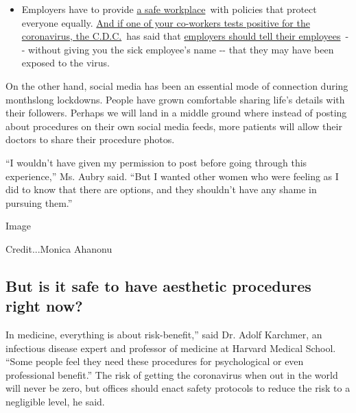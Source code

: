 \begin{itemize}
  \begin{itemize}
  \tightlist
  \item
    Employers have to provide
    \href{https://www.osha.gov/SLTC/covid-19/standards.html}{a safe
    workplace}~with policies that protect everyone equally.
    \href{https://www.nytimes3xbfgragh.onion/article/coronavirus-money-unemployment.html?action=click\&pgtype=Article\&state=default\&region=MAIN_CONTENT_3\&context=storylines_faq}{And
    if one of your co-workers tests positive for the coronavirus, the
    C.D.C.}~has said that
    \href{https://www.cdc.gov/coronavirus/2019-ncov/community/guidance-business-response.html}{employers
    should tell their employees}~-\/- without giving you the sick
    employee's name -\/- that they may have been exposed to the virus.
  \end{itemize}
\end{itemize}

On the other hand, social media has been an essential mode of connection
during monthslong lockdowns. People have grown comfortable sharing
life's details with their followers. Perhaps we will land in a middle
ground where instead of posting about procedures on their own social
media feeds, more patients will allow their doctors to share their
procedure photos.

``I wouldn't have given my permission to post before going through this
experience,'' Ms. Aubry said. ``But I wanted other women who were
feeling as I did to know that there are options, and they shouldn't have
any shame in pursuing them.''

Image

Credit...Monica Ahanonu

\hypertarget{but-is-it-safe-to-have-aesthetic-procedures-right-now}{%
\subsection{But is it safe to have aesthetic procedures right
now?}\label{but-is-it-safe-to-have-aesthetic-procedures-right-now}}

In medicine, everything is about risk-benefit,'' said Dr. Adolf
Karchmer, an infectious disease expert and professor of medicine at
Harvard Medical School. ``Some people feel they need these procedures
for psychological or even professional benefit.'' The risk of getting
the coronavirus when out in the world will never be zero, but offices
should enact safety protocols to reduce the risk to a negligible level,
he said.

